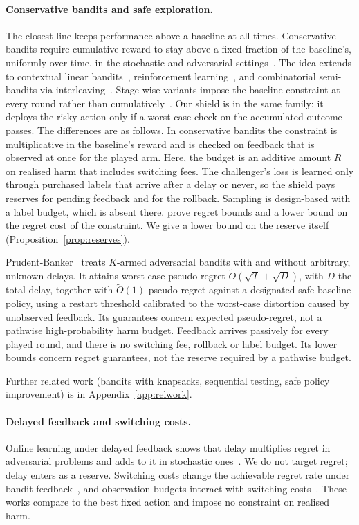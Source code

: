 \documentclass[10pt]{article}
\theoremstyle{plain}
\theoremstyle{definition}
\begin{document}
\paragraph{Conservative bandits and safe exploration.}
The closest line keeps performance above a baseline at all times. Conservative bandits require cumulative reward to stay above a fixed fraction of the baseline's, uniformly over time, in the stochastic and adversarial settings~\citep{wu2016conservative}. The idea extends to contextual linear bandits~\citep{kazerouni2017conservative}, reinforcement learning~\citep{garcelon2020conservative}, and combinatorial semi-bandits via interleaving~\citep{katariya2019conservative}. Stage-wise variants impose the baseline constraint at every round rather than cumulatively~\citep{moradipari2020stagewise}. Our shield is in the same family: it deploys the risky action only if a worst-case check on the accumulated outcome passes.
The differences are as follows. In conservative bandits the constraint is multiplicative in the baseline's reward and is checked on feedback that is observed at once for the played arm. Here, the budget is an additive amount $R$ on realised harm that includes switching fees. The challenger's loss is learned only through purchased labels that arrive after a delay or never, so the shield pays reserves for pending feedback and for the rollback. Sampling is design-based with a label budget, which is absent there. \citet{wu2016conservative} prove regret bounds and a lower bound on the regret cost of the constraint. We give a lower bound on the reserve itself (Proposition~\ref{prop:reserves}).

Prudent-Banker~\citep{hu2026prudent} treats $K$-armed adversarial bandits with and without arbitrary, unknown delays. It attains worst-case pseudo-regret $\tilde O(\sqrt T+\sqrt D)$, with $D$ the total delay, together with $\tilde O(1)$ pseudo-regret against a designated safe baseline policy, using a restart threshold calibrated to the worst-case distortion caused by unobserved feedback. Its guarantees concern expected pseudo-regret, not a pathwise high-probability harm budget. Feedback arrives passively for every played round, and there is no switching fee, rollback or label budget. Its lower bounds concern regret guarantees, not the reserve required by a pathwise budget.

Further related work (bandits with knapsacks, sequential testing, safe policy improvement) is in Appendix~\ref{app:relwork}.

\paragraph{Delayed feedback and switching costs.}
Online learning under delayed feedback shows that delay multiplies regret in adversarial problems and adds to it in stochastic ones~\citep{joulani2013delayed}. We do not target regret; delay enters as a reserve. Switching costs change the achievable regret rate under bandit feedback~\citep{cesabianchi2013switching}, and observation budgets interact with switching costs~\citep{cheng2023feedback}. These works compare to the best fixed action and impose no constraint on realised harm.
\end{document}

